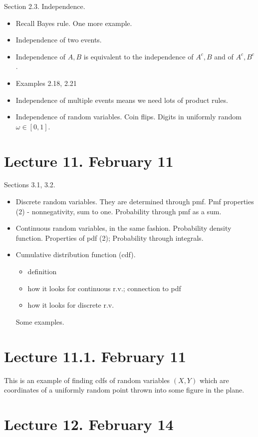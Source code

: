 \documentclass[letterpaper,11pt,oneside,reqno]{amsart}
\numberwithin{equation}{section}
\theoremstyle{definition}
\begin{document}
Section 2.3. Independence.
\begin{itemize}
	\item Recall Bayes rule. One more example.
	\item Independence of two events.
	\item 
		Independence of $A,B$ is equivalent to the independence
		of $A^c, B$ and of $A^c,B^c$.
	\item Examples 2.18, 2.21
	\item Independence of multiple events means we need lots of product rules.
	\item Independence of random variables. Coin flips. Digits in 
		uniformly random $\omega\in [0,1]$.
\end{itemize}

\section*{Lecture 11. February 11}

Sections 3.1, 3.2. 
\begin{itemize}
\item 
Discrete random variables. 
They are determined through pmf. 
Pmf properties (2) - nonnegativity, sum to one. Probability through pmf as a sum.
\item 
	Continuous random variables, in the same fashion. Probability density function. Properties of pdf (2); Probability through integrals.
\item 
	Cumulative distribution function (cdf).
	\begin{itemize}
		\item 
	definition
\item 
	how it looks for continuous r.v.; connection to pdf	
\item 
	how it looks for discrete r.v.
	\end{itemize}
	Some examples.
\end{itemize}

\section*{Lecture 11.1. February 11}

This is an example of finding cdfs of random variables $(X,Y)$ which are coordinates
of a uniformly random point thrown into some figure in the plane.

\section*{Lecture 12. February 14}
\end{document}
